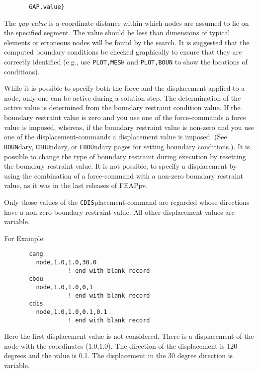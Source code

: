 \begin{verbatim}
       GAP,value}
\end{verbatim}
The {\it gap-value} is a coordinate distance within which
nodes are assumed to lie on the specified segment.  The
value should be less than dimensions of typical elements
or erroneous nodes will be found by the search.
It is suggested that the computed boundary conditions
be checked graphically to ensure that they are
correctly identified (e.g., use {\tt PLOT,MESH} and {\tt PLOT,BOUN}
to show the locations of conditions).

While it is possible to specify both the force and the displacement applied
to a node, only one can be active during a solution step.  The determination
of the active value is determined from the boundary
restraint condition value.  If the boundary restraint value is zero
and you use one of the force-commands a force
value is imposed, whereas, if the boundary restraint value is non-zero
and you use one of the displacement-commands a
displacement value is imposed. (See {\tt BOUN}dary, {\tt CBOU}ndary,
or {\tt EBOU}ndary pages for setting boundary
conditions.).  It is possible to change the type of boundary restraint
during execution by resetting the boundary restraint value. It is not
possible, to specify a displacement by using the combination of a 
force-command with a non-zero boundary restraint value, as it was
in the last releases of FEAPpv.

Only those values of the {\tt CDIS}placement-command are regarded whose
directions have a non-zero boundary restraint value. All other displacement
values are variable.

For Example:

\begin{verbatim}
       cang
         node,1.0,1.0,30.0
                  ! end with blank record
       cbou
         node,1.0,1.0,0,1
                  ! end with blank record
       cdis
         node,1.0,1.0,0.1,0.1
                  ! end with blank record
\end{verbatim}
Here the first displacement value is not considered. There is a
displacement of the node with the coordinates (1.0,1.0). The direction
of the displacement is 120 degrees and the value is 0.1. The displacement
in the 30 degree direction is variable.
\vfil\eject

